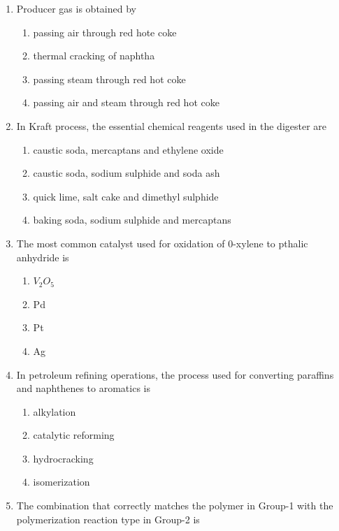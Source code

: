 \documentclass[journal,12pt,onecolumn]{IEEEtran}
\theoremstyle{remark}
\begin{document}
\begin{enumerate}
    \item Producer gas is obtained by

\begin{enumerate}
    \item passing air through red hote coke
    \item thermal cracking of naphtha
    \item passing steam through red hot coke
    \item passing air and steam through red hot coke
\end{enumerate}
\newpage
    \item In Kraft process, the essential chemical reagents used in the digester are

\begin{enumerate}
    \item caustic soda, mercaptans and ethylene oxide
    \item caustic soda, sodium sulphide and soda ash
    \item quick lime, salt cake and dimethyl sulphide
    \item baking soda, sodium sulphide and mercaptans
\end{enumerate}

    \item The most common catalyst used for oxidation of 0-xylene to pthalic anhydride is

\begin{enumerate}
    \item $V_2 O_5$
    \item Pd
    \item Pt
    \item Ag
\end{enumerate}

    \item In petroleum refining operations, the process used for converting paraffins and naphthenes to aromatics is

\begin{enumerate}
    \item alkylation
    \item catalytic reforming
    \item hydrocracking
    \item isomerization
\end{enumerate}


    \item The combination that correctly matches the polymer in Group-1 with the polymerization reaction type in Group-2 is


\end{enumerate}
\end{document}
